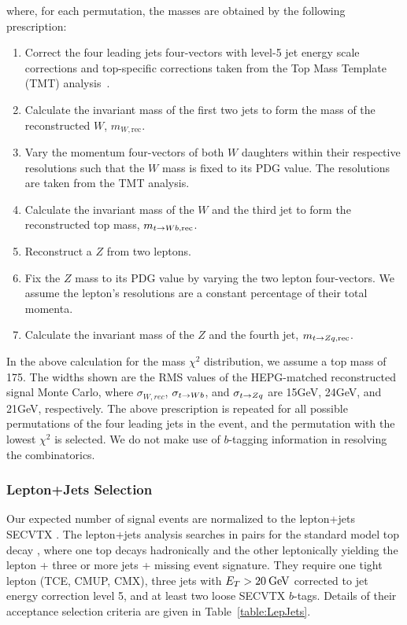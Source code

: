 where, for each permutation, the masses are obtained by the following prescription:

\begin{enumerate}
\item Correct the four leading jets four-vectors with level-5 jet energy scale
  corrections and top-specific corrections taken from the Top Mass
  Template (TMT) analysis~\cite{CDF7532}.
\item Calculate the invariant mass of the first two jets to form the mass
  of the reconstructed $W$, $m_{W,\mathrm{rec}}$.
\item Vary the momentum four-vectors of both $W$ daughters within their respective
  resolutions such that the $W$ mass is fixed to its PDG value. The
  resolutions are taken from the TMT analysis.
\item Calculate the invariant mass of the $W$ and the third jet to form the reconstructed
  top mass, $m_{{t\rightarrow Wb},\mathrm{rec}}$.
\item Reconstruct a $Z$ from two leptons.
\item Fix the $Z$ mass to its PDG value by varying the two lepton four-vectors. We 
  assume the lepton's resolutions are a constant percentage of their total momenta.
\item Calculate the invariant mass of the $Z$ and the fourth jet, 
  $m_{{t\rightarrow Zq},\mathrm{rec}}$.
\end{enumerate}

In the above calculation for the mass $\chi^{2}$ distribution, we assume a top mass
of 175\gevcsq. The widths shown are the RMS values of the HEPG-matched reconstructed
signal Monte Carlo, where $\sigma_{W, rec}$, $\sigma_{{t\rightarrow Wb}}$, and $\sigma_{{t\rightarrow Zq}}$
are 15\unit{GeV}, 24\unit{GeV}, and 21\unit{GeV}, respectively. The above prescription 
is repeated for all possible permutations of the four leading jets in the event, and 
the permutation with the lowest $\chi^2$ is selected. We do not make use of $b$-tagging 
information in resolving the combinatorics.


\subsubsection{Lepton+Jets Selection}
Our expected number of signal events are normalized to the lepton+jets SECVTX
\xsect. The lepton+jets analysis searches in \ttbar pairs for the standard model 
top decay \tWb, where one top decays hadronically and the other leptonically 
yielding the lepton + three or more jets + missing \Et event signature. They require one 
tight lepton (TCE, CMUP, CMX), three jets with $E_{T}>20\:\mathrm{GeV}$ corrected to jet 
energy correction level 5, and at least two loose SECVTX $b$-tags. Details of their acceptance 
selection criteria are given in Table~\ref{table:LepJets}.

